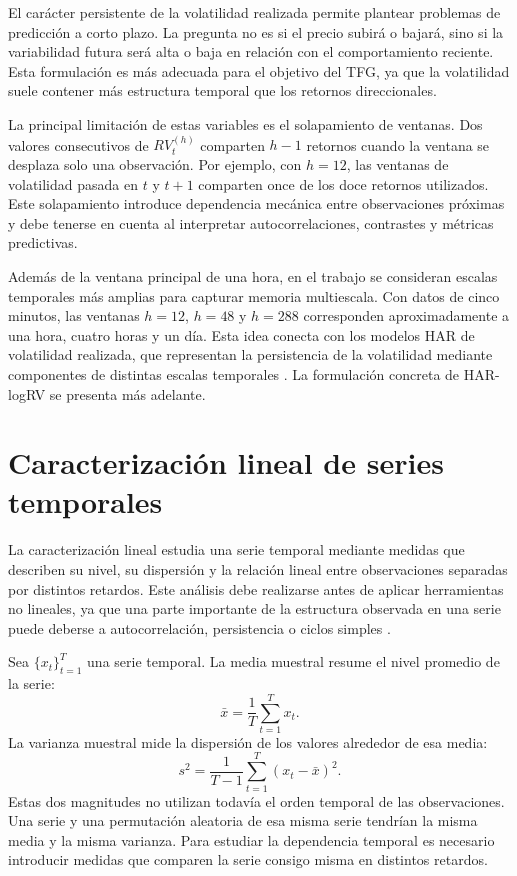 El carácter persistente de la volatilidad realizada permite plantear problemas de predicción a corto plazo. La pregunta no es si el precio subirá o bajará, sino si la variabilidad futura será alta o baja en relación con el comportamiento reciente. Esta formulación es más adecuada para el objetivo del TFG, ya que la volatilidad suele contener más estructura temporal que los retornos direccionales.

La principal limitación de estas variables es el solapamiento de ventanas. Dos valores consecutivos de \(RV_t^{(h)}\) comparten \(h-1\) retornos cuando la ventana se desplaza solo una observación. Por ejemplo, con \(h=12\), las ventanas de volatilidad pasada en \(t\) y \(t+1\) comparten once de los doce retornos utilizados. Este solapamiento introduce dependencia mecánica entre observaciones próximas y debe tenerse en cuenta al interpretar autocorrelaciones, contrastes y métricas predictivas.

Además de la ventana principal de una hora, en el trabajo se consideran escalas temporales más amplias para capturar memoria multiescala. Con datos de cinco minutos, las ventanas \(h=12\), \(h=48\) y \(h=288\) corresponden aproximadamente a una hora, cuatro horas y un día. Esta idea conecta con los modelos HAR de volatilidad realizada, que representan la persistencia de la volatilidad mediante componentes de distintas escalas temporales \cite{corsi2009}. La formulación concreta de HAR-logRV se presenta más adelante.

\section{Caracterización lineal de series temporales}\label{sec:caracterizacion-lineal}

La caracterización lineal estudia una serie temporal mediante medidas que describen su nivel, su dispersión y la relación lineal entre observaciones separadas por distintos retardos. Este análisis debe realizarse antes de aplicar herramientas no lineales, ya que una parte importante de la estructura observada en una serie puede deberse a autocorrelación, persistencia o ciclos simples \cite{brockwell2002,box2015}.

Sea \(\{x_t\}_{t=1}^{T}\) una serie temporal. La media muestral resume el nivel promedio de la serie:
\begin{equation}
    \bar{x}=\frac{1}{T}\sum_{t=1}^{T}x_t.
\end{equation}
La varianza muestral mide la dispersión de los valores alrededor de esa media:
\begin{equation}
    s^2=\frac{1}{T-1}\sum_{t=1}^{T}(x_t-\bar{x})^2.
\end{equation}
Estas dos magnitudes no utilizan todavía el orden temporal de las observaciones. Una serie y una permutación aleatoria de esa misma serie tendrían la misma media y la misma varianza. Para estudiar la dependencia temporal es necesario introducir medidas que comparen la serie consigo misma en distintos retardos.

